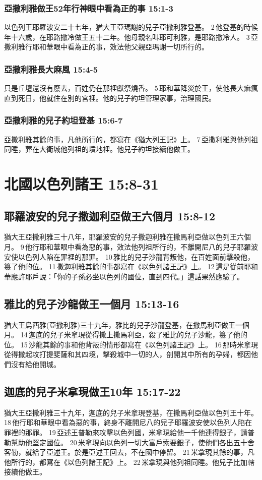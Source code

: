 \subsubsection{亞撒利雅做王52年行神眼中看為正的事 15:1-3 }
以色列王耶羅波安二十七年，猶大王亞瑪謝的兒子亞撒利雅登基。 2 他登基的時候年十六歲，在耶路撒冷做王五十二年。他母親名叫耶可利雅，是耶路撒冷人。 3 亞撒利雅行耶和華眼中看為正的事，效法他父親亞瑪謝一切所行的。

\subsubsection{亞撒利雅長大麻風 15:4-5 }
只是丘壇還沒有廢去，百姓仍在那裡獻祭燒香。 5 耶和華降災於王，使他長大痲瘋直到死日，他就住在別的宮裡。他的兒子約坦管理家事，治理國民。

\subsubsection{亞撒利雅的兒子約坦登基 15:6-7 }
亞撒利雅其餘的事，凡他所行的，都寫在《猶大列王記》上。 7 亞撒利雅與他列祖同睡，葬在大衛城他列祖的墳地裡。他兒子約坦接續他做王。

\section{北國以色列諸王 15:8-31 }
\subsection{耶羅波安的兒子撒迦利亞做王六個月 15:8-12 }
猶大王亞撒利雅三十八年，耶羅波安的兒子撒迦利雅在撒馬利亞做以色列王六個月。 9 他行耶和華眼中看為惡的事，效法他列祖所行的，不離開尼八的兒子耶羅波安使以色列人陷在罪裡的那罪。 10 雅比的兒子沙龍背叛他，在百姓面前擊殺他，篡了他的位。 11 撒迦利雅其餘的事都寫在《以色列諸王記》上。 12 這是從前耶和華應許耶戶說：「你的子孫必坐以色列的國位，直到四代。」這話果然應驗了。

\subsection{雅比的兒子沙龍做王一個月 15:13-16 }
猶大王烏西雅(亞撒利雅)三十九年，雅比的兒子沙龍登基，在撒馬利亞做王一個月。 14 迦底的兒子米拿現從得撒上撒馬利亞，殺了雅比的兒子沙龍，篡了他的位。 15 沙龍其餘的事和他背叛的情形都寫在《以色列諸王記》上。 16 那時米拿現從得撒起攻打提斐薩和其四境，擊殺城中一切的人，剖開其中所有的孕婦，都因他們沒有給他開城。

\subsection{迦底的兒子米拿現做王10年 15:17-22 }
猶大王亞撒利雅三十九年，迦底的兒子米拿現登基，在撒馬利亞做以色列王十年。 18 他行耶和華眼中看為惡的事，終身不離開尼八的兒子耶羅波安使以色列人陷在罪裡的那罪。 19 亞述王普勒來攻擊以色列國，米拿現給他一千他連得銀子，請普勒幫助他堅定國位。 20 米拿現向以色列一切大富戶索要銀子，使他們各出五十舍客勒，就給了亞述王。於是亞述王回去，不在國中停留。 21 米拿現其餘的事，凡他所行的，都寫在《以色列諸王記》上。 22 米拿現與他列祖同睡。他兒子比加轄接續他做王。

